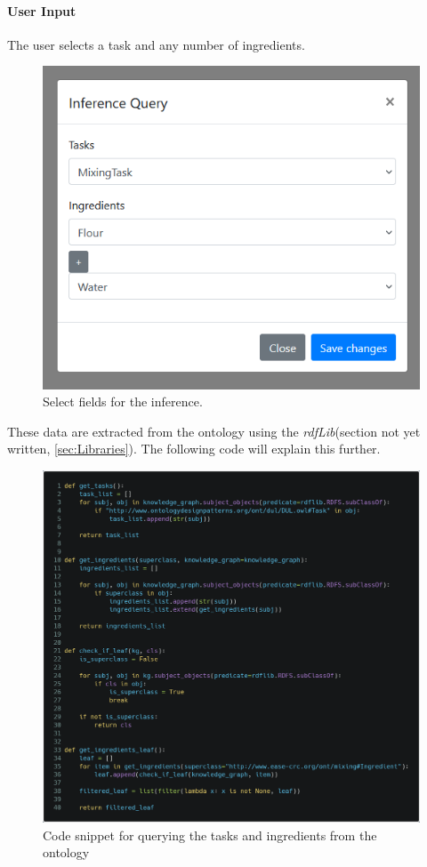 \paragraph*{User Input}

The user selects a task and any number of ingredients.
\begin{figure}[H]
    \includegraphics[scale=0.45]{Graphics/inference_user_input.png}
    \caption{Select fields for the inference.}
\end{figure}
These data are extracted from the ontology using the \textit{rdfLib}(section not yet written, 
\ref{sec:Libraries}). The following code will explain this further.

\begin{figure}[H]
    \includegraphics[scale=0.22]{Graphics/get_tasks_ingredients.png}
    \caption{Code snippet for querying the tasks and ingredients from the ontology}
\end{figure}

